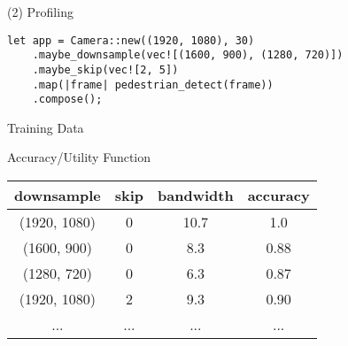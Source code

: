 \begin{frame}[fragile]{(2) Profiling}

\begin{lstlisting}
let app = Camera::new((1920, 1080), 30)
    .maybe_downsample(vec![(1600, 900), (1280, 720)])
    .maybe_skip(vec![2, 5])
    .map(|frame| pedestrian_detect(frame))
    .compose();
\end{lstlisting}

  Training Data

  Accuracy/Utility Function

  \footnotesize
  \begin{table}
    \centering
    \begin{tabular}{c c c c}
      \toprule
      downsample & skip & bandwidth & accuracy \\
      \midrule
      (1920, 1080) & 0 & 10.7 & 1.0 \\
      (1600, 900)  & 0 & 8.3 & 0.88  \\
      (1280, 720)  & 0 & 6.3 & 0.87 \\
      (1920, 1080) & 2 & 9.3 & 0.90 \\
      ... & ... & ... & ... \\
      \bottomrule
    \end{tabular}
  \end{table}
\end{frame}

